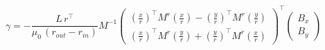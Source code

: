 \begin{equation} \label{eq:57} 
\gamma = -\frac{L\,r^\top}{\mu_0\,\left(r_{out} - r_{in}\right)} M^{-1} \begin{pmatrix}
\left(\frac{x}{r}\right)^\top M^r \left(\frac{x}{r}\right) - \left(\frac{y}{r}\right)^\top M^r \left(\frac{y}{r}\right) \\
\left(\frac{x}{r}\right)^\top M^r \left(\frac{y}{r}\right) + \left(\frac{y}{r}\right)^\top M^r \left(\frac{x}{r}\right) \end{pmatrix}^{\top} \begin{pmatrix} B_x \\ B_y \end{pmatrix}
\end{equation}







